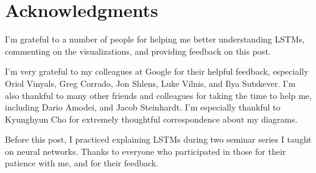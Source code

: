 \documentclass[12pt]{article} %
\begin{document}
\section{Acknowledgments}

I'm grateful to a number of people for helping me better understanding LSTMs, commenting on the visualizations, and providing feedback on this post.

I'm very grateful to my colleagues at Google for their helpful feedback, especially Oriol Vinyals, Greg Corrado, Jon Shlens, Luke Vilnis, and Ilya Sutskever. I'm also thankful to many other friends and colleagues for taking the time to help me, including Dario Amodei, and Jacob Steinhardt. I'm especially thankful to Kyunghyun Cho for extremely thoughtful correspondence about my diagrams.

Before this post, I practiced explaining LSTMs during two seminar series I taught on neural networks. Thanks to everyone who participated in those for their patience with me, and for their feedback.



\end{document}
